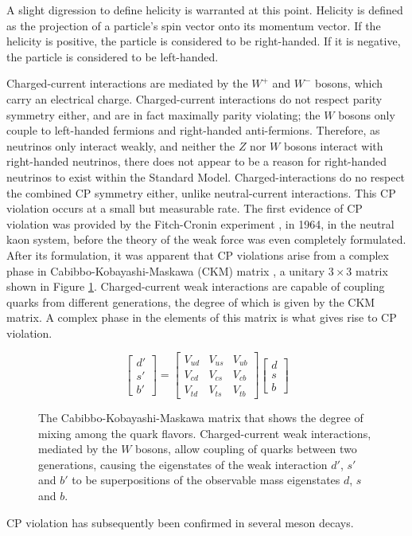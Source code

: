 \documentclass[12pt,a4paper,openright,twoside]{report}
\begin{document}
A slight digression to define helicity is warranted at this point. Helicity is defined as the projection of a particle's spin vector onto its momentum vector. If the helicity is positive, the particle is considered to be right-handed. If it is negative, the particle is considered to be left-handed.

Charged-current interactions are mediated by the $W^+$ and $W^-$ bosons, which carry an electrical charge. Charged-current interactions do not respect parity symmetry either, and are in fact maximally parity violating; the $W$ bosons only couple to left-handed fermions and right-handed anti-fermions. Therefore, as neutrinos only interact weakly, and neither the $Z$ nor $W$ bosons interact with right-handed neutrinos, there does not appear to be a reason for right-handed neutrinos to exist within the Standard Model. Charged-interactions do no respect the combined CP symmetry either, unlike neutral-current interactions. This CP violation occurs at a small but measurable rate. The first evidence of CP violation was provided by the Fitch-Cronin experiment \cite{cronin_fitch}, in 1964, in the neutral kaon system, before the theory of the weak force was even completely formulated. After its formulation, it was apparent that CP violations arise from a complex phase in Cabibbo-Kobayashi-Maskawa (CKM) matrix \cite{CKM}, a unitary $3\times 3$ matrix shown in Figure \ref{fig:CKM matrix}. Charged-current weak interactions are capable of coupling quarks from different generations, the degree of which is given by the CKM matrix. A complex phase in the elements of this matrix is what gives rise to CP violation.
\begin{figure}[H]
\[
\begin{bmatrix}
d'\\
s'\\
b'
\end{bmatrix}
=
\begin{bmatrix}
V_{ud} & V_{us} & V_{ub}\\
V_{cd} & V_{cs} & V_{cb}\\
V_{td} & V_{ts} & V_{tb}
\end{bmatrix}
\begin{bmatrix}
d\\
s\\
b
\end{bmatrix}
\]
\caption{The Cabibbo-Kobayashi-Maskawa matrix that shows the degree of mixing among the quark flavors. Charged-current weak interactions, mediated by the $W$ bosons, allow coupling of quarks between two generations, causing the eigenstates of the weak interaction $d'$, $s'$ and $b'$ to be superpositions of the observable mass eigenstates $d$, $s$ and $b$.}
\label{fig:CKM matrix}
\end{figure}
CP violation has subsequently been confirmed in several meson decays\cite{CP1,CP2,CP3,CP4,CP5,CP6}.
\end{document}
